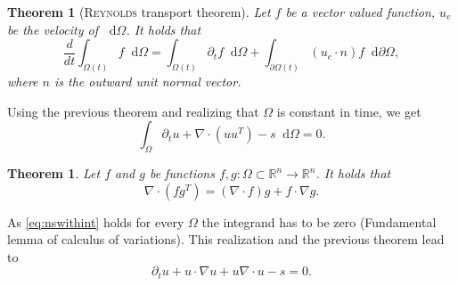 \documentclass[12pt,a4paper,twoside, open=right]{scrreprt}
\theoremstyle{definition}
\theoremstyle{plain}
\newtheorem{sa}[auf]{Theorem}
\newcommand{\rr}{\mathbb{R}}
\newcommand{\D}{\mathop{}\!\mathrm{d}}
\begin{document}
\begin{sa}[\textsc{Reynolds} transport theorem]
    Let $f$ be a vector valued function, $u_e$ be the velocity of $\D\Omega$. It holds that
    \begin{equation}
        \frac{d}{dt}\int_{\Omega(t)}f\D \Omega =\int_{\Omega(t)}\partial_t f\D \Omega+\int_{\partial\Omega(t)}(u_e\cdot n)f\D \partial \Omega,
    \end{equation}
    where $n$ is the outward unit normal vector.
\end{sa}
Using the previous theorem and realizing that $\Omega$ is constant in time, we get
\begin{equation}\label{eq:nswithint}
    \int_\Omega \partial_t u +\nabla\cdot(uu^T)-s\D\Omega =0.
\end{equation}
\begin{sa}
    Let $f$ and $g$ be functions $f,g\colon\Omega\subset\rr^n\to\rr^n$. It holds that
    \begin{equation}
    \nabla\cdot(fg^T)=(\nabla\cdot f)g+f\cdot\nabla g.
    \end{equation}
\end{sa}
As \eqref{eq:nswithint} holds for every $\Omega$ the integrand has to be zero (Fundamental lemma of calculus of variations). This realization and the previous theorem lead to 
\begin{equation}
    \partial_t u +u\cdot\nabla u+u\nabla\cdot u - s = 0.
\end{equation}
\end{document}
